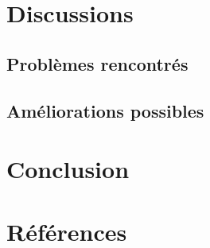 \documentclass[a4paper]{article}
\begin{document}
\section{Discussions}
\subsection{Problèmes rencontrés}


\subsection{Améliorations possibles}


\section{Conclusion}

\newpage


\section{Références}
\nocite{*}


\end{document}
